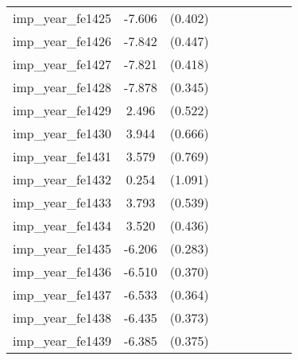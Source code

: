 {\begin{tabular}{l*{4}{cc}}
imp\_year\_fe1425&   -7.606\sym{***}&  (0.402)&                  &         &                  &         &                  &         \\
imp\_year\_fe1426&   -7.842\sym{***}&  (0.447)&                  &         &                  &         &                  &         \\
imp\_year\_fe1427&   -7.821\sym{***}&  (0.418)&                  &         &                  &         &                  &         \\
imp\_year\_fe1428&   -7.878\sym{***}&  (0.345)&                  &         &                  &         &                  &         \\
imp\_year\_fe1429&    2.496\sym{***}&  (0.522)&                  &         &                  &         &                  &         \\
imp\_year\_fe1430&    3.944\sym{***}&  (0.666)&                  &         &                  &         &                  &         \\
imp\_year\_fe1431&    3.579\sym{***}&  (0.769)&                  &         &                  &         &                  &         \\
imp\_year\_fe1432&    0.254         &  (1.091)&                  &         &                  &         &                  &         \\
imp\_year\_fe1433&    3.793\sym{***}&  (0.539)&                  &         &                  &         &                  &         \\
imp\_year\_fe1434&    3.520\sym{***}&  (0.436)&                  &         &                  &         &                  &         \\
imp\_year\_fe1435&   -6.206\sym{***}&  (0.283)&                  &         &                  &         &                  &         \\
imp\_year\_fe1436&   -6.510\sym{***}&  (0.370)&                  &         &                  &         &                  &         \\
imp\_year\_fe1437&   -6.533\sym{***}&  (0.364)&                  &         &                  &         &                  &         \\
imp\_year\_fe1438&   -6.435\sym{***}&  (0.373)&                  &         &                  &         &                  &         \\
imp\_year\_fe1439&   -6.385\sym{***}&  (0.375)&                  &         &                  &         &                  &         \\

\end{tabular}}
